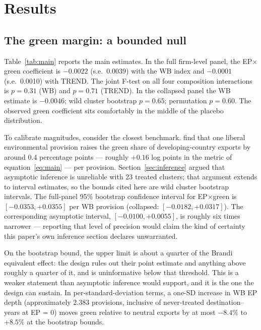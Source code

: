 \documentclass[12pt]{article}
\begin{document}
\section{Results}\label{sec:results}

\subsection{The green margin: a bounded null}\label{sec:green}

Table~\ref{tab:main} reports the main estimates. In the full firm-level panel, the
EP$\times$green coefficient is $-0.0022$ (s.e.\ 0.0039) with the WB index and $-0.0001$
(s.e.\ 0.0010) with TREND. The joint F-test on all four composition interactions is
$p = 0.31$ (WB) and $p = 0.71$ (TREND). In the collapsed panel the WB estimate is
$-0.0046$; wild cluster bootstrap $p = 0.65$; permutation $p = 0.60$. The observed
green coefficient sits comfortably in the middle of the placebo distribution.

\begin{table}[htbp]
\centering
\caption{Triple-difference estimates: EP content and export composition}
\label{tab:main}

\end{table}

To calibrate magnitudes, consider the closest benchmark. \citet{brandi2020} find that one liberal
environmental provision raises the green share of developing-country exports by around
0.4 percentage points --- roughly $+0.16$ log points in the metric of
equation~\eqref{eq:main} --- per provision. Section~\ref{sec:inference} argued that
asymptotic inference is unreliable with 23 treated clusters; that argument extends to
interval estimates, so the bounds cited here are wild cluster bootstrap intervals. The
full-panel 95\% bootstrap confidence interval for EP$\times$green is $[-0.0353, +0.0355]$
per WB provision (collapsed: $[-0.0182, +0.0317]$). The corresponding asymptotic
interval, $[-0.0100, +0.0055]$, is roughly six times narrower --- reporting that level
of precision would claim the kind of certainty this paper's own inference section
declares unwarranted.

On the bootstrap bound, the upper limit is about a quarter of the Brandi equivalent
effect: the design rules out their point estimate and anything above roughly a quarter of
it, and is uninformative below that threshold. This is a weaker statement than asymptotic
inference would support, and it is the one the design can sustain. In per-standard-deviation
terms, a one-SD increase in WB EP depth (approximately 2.383 provisions, inclusive of
never-treated destination--years at EP = 0) moves green relative to neutral exports by at
most $-8.4\%$ to $+8.5\%$ at the bootstrap bounds.
\end{document}
